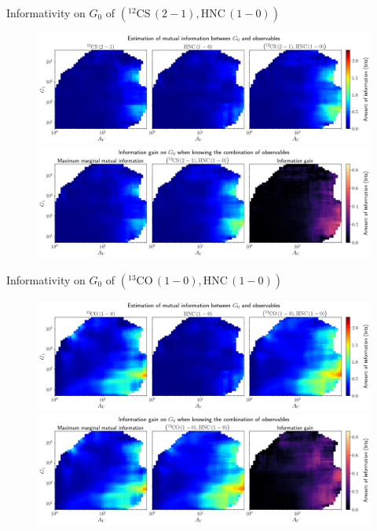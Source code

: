 \documentclass{beamer}
\begin{document}
\begin{frame}{Informativity on $G_0$ of $\left(\mathrm{^{12}CS\,(2-1)},\mathrm{HNC\,(1-0)}\right)$}
    \begin{figure}
        \centering
        \includegraphics[width=0.95\linewidth]{../mi/g0__12cs21_hnc10_mi.png}
        \vfill
        \includegraphics[width=0.95\linewidth]{../mi/g0__12cs21_hnc10_mi_gain.png}
    \end{figure}
\end{frame}

\begin{frame}{Informativity on $G_0$ of $\left(\mathrm{^{13}CO\,(1-0)},\mathrm{HNC\,(1-0)}\right)$}
    \begin{figure}
        \centering
        \includegraphics[width=0.95\linewidth]{../mi/g0__13co10_hnc10_mi.png}
        \vfill
        \includegraphics[width=0.95\linewidth]{../mi/g0__13co10_hnc10_mi_gain.png}
    \end{figure}
\end{frame}
\end{document}
